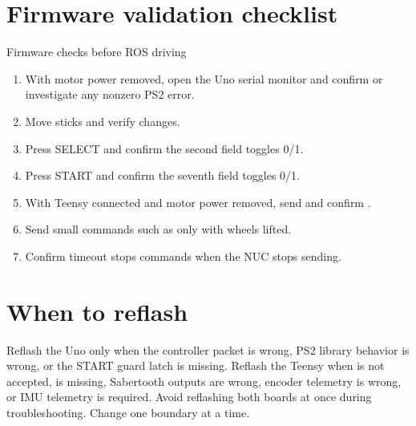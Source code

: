 \section{Firmware validation checklist}

\begin{operatorbox}{Firmware checks before ROS driving}
\begin{enumerate}
  \item With motor power removed, open the Uno serial monitor and confirm  or investigate any nonzero PS2 error.
  \item Move sticks and verify  changes.
  \item Press SELECT and confirm the second field toggles 0/1.
  \item Press START and confirm the seventh field toggles 0/1.
  \item With Teensy connected and motor power removed, send  and confirm .
  \item Send small commands such as  only with wheels lifted.
  \item Confirm timeout stops commands when the NUC stops sending.
\end{enumerate}
\end{operatorbox}

\section{When to reflash}

Reflash the Uno only when the controller packet is wrong, PS2 library behavior is wrong, or the START guard latch is missing. Reflash the Teensy when  is not accepted,  is missing, Sabertooth outputs are wrong, encoder telemetry is wrong, or IMU telemetry is required. Avoid reflashing both boards at once during troubleshooting. Change one boundary at a time.
